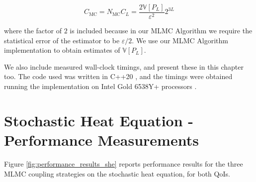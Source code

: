 \begin{equation*}
    C_{\mathrm{MC}} = N_{\mathrm{MC}} C_L = \frac{2 \mathbb{V}[P_L]}{\varepsilon^2}2^{3L}
\end{equation*}

where the factor of $2$ is included because in our MLMC Algorithm we 
require the statistical error of the estimator to be $\varepsilon / 2$.
We use our MLMC Algorithm implementation to obtain estimates of 
$\mathbb{V}[P_L]$.

We also include measured wall-clock timings, and present these in this chapter too.
The code used was written in C++20 \cite{cpp20standard}, 
and the timings were obtained running the implementation on Intel Gold 6538Y+ processors
\cite{intel_xeon_gold_6538y}.

\section{Stochastic Heat Equation - Performance Measurements}

Figure \ref{fig:performance_results_she} reports performance results for the three MLMC 
coupling strategies on the stochastic heat equation, for both QoIs.

